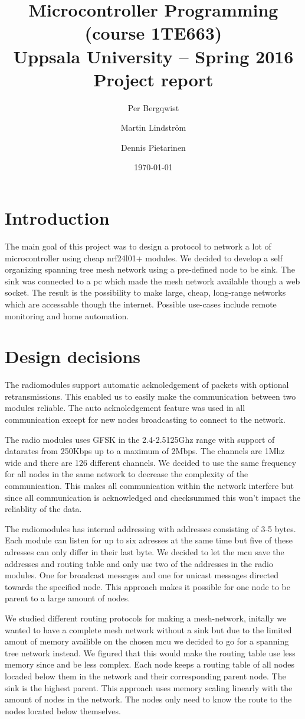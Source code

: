 \documentclass[a4paper,11pt]{article}
\title{\textbf{Microcontroller Programming (course 1TE663) \\
    Uppsala University -- Spring 2016 \\
    Project report}}
\author{Per Bergqwist \and Martin Lindström \and Dennis Pietarinen}
\date{\today}
\begin{document}
\maketitle

\tableofcontents

\section{Introduction}
The main goal of this project was to design a protocol to
network a lot of microcontroller using cheap nrf24l01+ modules.  We
decided to develop a self organizing spanning tree mesh network using
a pre-defined node to be sink.  The sink was connected to a pc which
made the mesh network available though a web socket.  The result is
the possibility to make large, cheap, long-range networks which are
accessable though the internet.  Possible use-cases include remote
monitoring and home automation.

\section{Design decisions}
The radiomodules support automatic acknoledgement of packets with
optional retransmissions. This enabled us to easily make the
communication between two modules reliable. The auto acknoledgement
feature was used in all communication except for new nodes
broadcasting to connect to the network.

The radio modules uses GFSK in the 2.4-2.5125Ghz range with support of
datarates from 250Kbps up to a maximum of 2Mbps. The channels are 1Mhz
wide and there are 126 different channels. We decided to use the same
frequency for all nodes in the same network to decrease the complexity
of the communication. This makes all communication within the network
interfere but since all communication is acknowledged and checksummed
this won't impact the reliablity of the data.

The radiomodules has internal addressing with addresses consisting of
3-5 bytes. Each module can listen for up to six adresses at the same
time but five of these adresses can only differ in their last byte. We
decided to let the mcu save the addresses and routing table and only
use two of the addresses in the radio modules. One for broadcast
messages and one for unicast messages directed towards the specified
node. This approach makes it possible for one node to be parent to a
large amount of nodes.

We studied different routing protocols for making a mesh-network,
initally we wanted to have a complete mesh network without a sink but
due to the limited amout of memory availible on the chosen mcu we
decided to go for a spanning tree network instead. We figured that
this would make the routing table use less memory since and be less
complex. Each node keeps a routing table of all nodes locaded below
them in the network and their corresponding parent node. The sink is
the highest parent. This approach uses memory scaling linearly with
the amount of nodes in the network. The nodes only need to know the
route to the nodes located below themselves.
\end{document}
